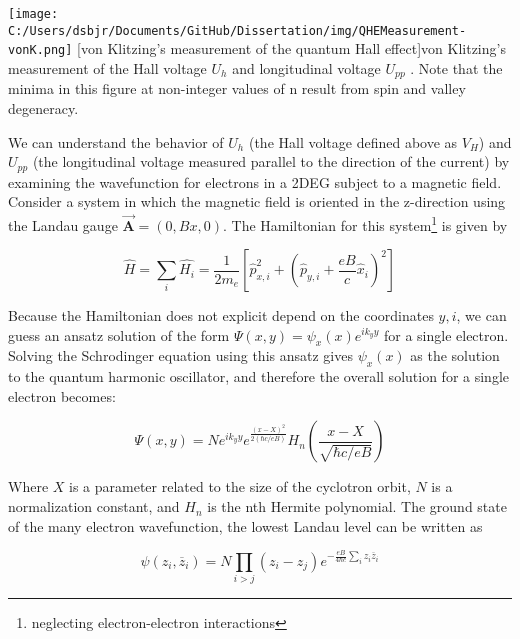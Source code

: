 \begin{centering}
\texttt{[image: C:/Users/dsbjr/Documents/GitHub/Dissertation/img/QHEMeasurement-vonK.png]}
  \captionsetup{width=0.75\textwidth}
  [von Klitzing's measurement of the quantum Hall effect]{von Klitzing's measurement of the Hall voltage $U_{h}$ and longitudinal voltage $U_{pp}$ \cite{VonKlitzing1980}. Note that the minima in this figure at non-integer values of n result from spin and valley degeneracy.}
  \label{fig:IQHE1}
\end{centering}

We can understand the behavior of $U_{h}$ (the Hall voltage defined above as $V_{H}$) and $U_{pp}$ (the longitudinal voltage measured parallel to the direction of the current) by examining the wavefunction for electrons in a 2DEG subject to a magnetic field. Consider a system in which the magnetic field is oriented in the z-direction using the Landau gauge $\vec{\mathbf{A}} = (0,Bx,0)$. The Hamiltonian for this system\footnote{neglecting electron-electron interactions} is given by

\begin{equation}
\hat{H} = \sum_{i} \hat{H_{i}} = \frac{1}{2m_{e}} \left[ \hat{p}_{x,i}^{2} + \left(\hat{p}_{y,i} + \frac{eB}{c} \hat{x}_{i} \right)^{2} \right]
\end{equation}

Because the Hamiltonian does not explicit depend on the coordinates $y,i$, we can guess an ansatz solution of the form $\Psi(x,y) = \psi_{x}(x) e^{ik_{y}y}$ for a single electron. Solving the Schrodinger equation using this ansatz gives $\psi_{x}(x)$ as the solution to the quantum harmonic oscillator, and therefore the overall solution for a single electron becomes:

\begin{equation}
\Psi(x,y) = N e^{ik_{y}y}e^{\frac{(x-X)^{2}}{2(\hbar c/eB)}} H_{n} \left(\frac{x-X}{\sqrt{\hbar c/ eB}} \right)
\end{equation}

Where $X$ is a parameter related to the size of the cyclotron orbit, $N$ is a normalization constant, and $H_{n}$ is the nth Hermite polynomial. The ground state of the many electron wavefunction, the lowest Landau level can be written as \cite{Yoshioka2002}

\begin{equation} \label{psi-el}
\psi(z_{i},\overline{z}_{i}) = N \prod_{i > j} (z_{i} - z_{j}) e^{-\frac{eB}{4 \hbar c} \sum_{i} z_{i} \overline{z}_{i}}
\end{equation}

